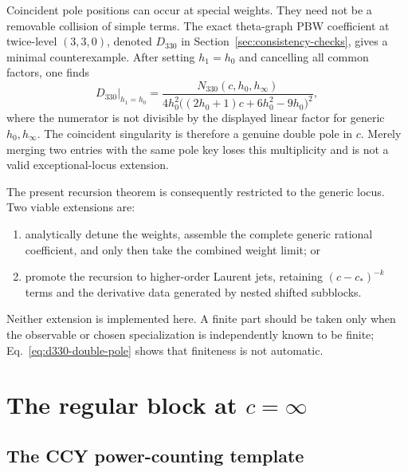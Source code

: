 \documentclass[11pt]{article}
\begin{document}
Coincident pole positions can occur at special weights.  They need not be a
removable collision of simple terms.  The exact theta-graph PBW coefficient
at twice-level \((3,3,0)\), denoted \(D_{330}\) in
Section~\ref{sec:consistency-checks}, gives a minimal counterexample.  After
setting \(h_1=h_0\) and cancelling all common factors, one finds
\begin{equation}
 D_{330}\big|_{h_1=h_0}
 =\frac{N_{330}(c,h_0,h_\infty)}
 {4h_0^2\bigl((2h_0+1)c+6h_0^2-9h_0\bigr)^2},
 \label{eq:d330-double-pole}
\end{equation}
where the numerator is not divisible by the displayed linear factor for
generic \(h_0,h_\infty\).  The coincident singularity is therefore a genuine
double pole in \(c\).  Merely merging two entries with the same pole key loses
this multiplicity and is not a valid exceptional-locus extension.

The present recursion theorem is consequently restricted to the generic
locus.  Two viable extensions are:
\begin{enumerate}
 \item analytically detune the weights, assemble the complete generic rational
 coefficient, and only then take the combined weight limit; or
 \item promote the recursion to higher-order Laurent jets, retaining
 \((c-c_*)^{-k}\) terms and the derivative data generated by nested shifted
 subblocks.
\end{enumerate}
Neither extension is implemented here.  A finite part should be taken only
when the observable or chosen specialization is independently known to be
finite; Eq.~\eqref{eq:d330-double-pole} shows that finiteness is not automatic.


\section{\texorpdfstring{The regular block at \(c=\infty\)}
{The regular block at c=infinity}}
\label{sec:large-c}

\subsection{The CCY power-counting template}
\end{document}
